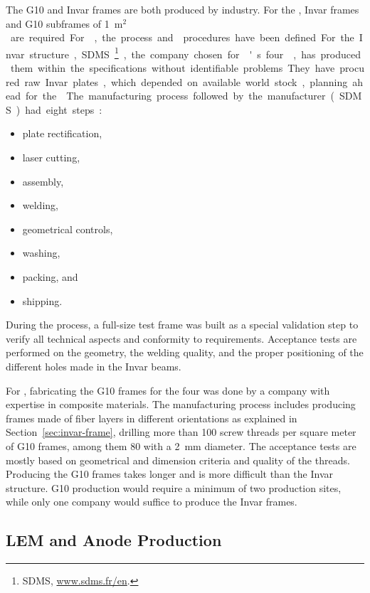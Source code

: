 The G10 and Invar frames are both produced by industry. For the , %
\dptotcrp Invar frames and \dpnumpmtch %
G10 subframes of \SI{1}{m$^2$} are required. 
For , the process and  procedures have been defined.
For the Invar structure, SDMS\footnote{SDMS\texttrademark{}, \url{www.sdms.fr/en}.}, the company chosen for 's four ,   
has produced them within the specifications without identifiable problems.
They have procured raw Invar plates, which depended on available world stock, planning ahead for the . 
The manufacturing process followed by the manufacturer (SDMS) had eight steps:\\
\begin{itemize}
\item plate rectification,
\item  laser cutting,
\item  assembly,
\item  welding,
\item  geometrical controls,
\item  washing,
\item  packing, and
\item  shipping.
\end{itemize}

During the process, a full-size test frame was built as a special validation step to verify all technical aspects and conformity to requirements. 
Acceptance tests are performed on the geometry, the welding quality, and the proper positioning of the different holes made in the Invar beams.

For , fabricating the G10 frames for the four  was done by a company with expertise in composite materials. The manufacturing process includes  
producing frames made of fiber layers in different orientations as explained in Section~\ref{sec:invar-frame}, drilling more than \num{100} screw threads per square meter of G10 frames, among them \num{80} with a \SI{2}{mm} diameter.
The acceptance tests are mostly based on geometrical and dimension criteria and quality of the threads.  
Producing the G10 frames takes longer and is more difficult than the Invar structure. G10 production would require a minimum of two production sites, while only one company would suffice to produce the Invar frames.


\subsection{LEM and Anode Production}
\label{sec:dp-crp-LASprod}


